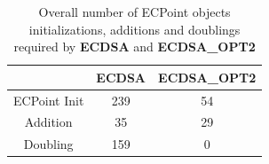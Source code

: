 \documentclass[authoryear]{elsarticle}
\begin{document}




\begin{table}[hb]
\caption{Overall number of ECPoint objects initializations, additions and doublings required by \textbf{ECDSA} and \textbf{ECDSA\_OPT2}}
\centering %
\begin{tabular}{|c|c|c|} %
\hline\hline %
 & ECDSA & ECDSA\_OPT2 \\
\hline\hline %
ECPoint Init & 239 & 54 \\
Addition     & 35  & 29 \\
Doubling   & 159 & 0 \\
\hline %
\end{tabular}
\label{table:CountOps} %
\end{table}
\end{document}
